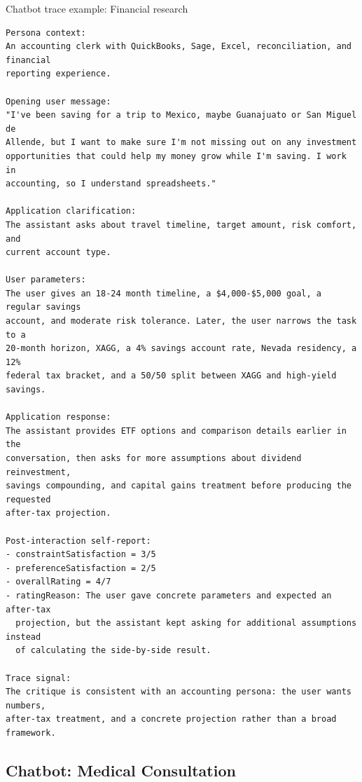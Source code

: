 \begin{promptbox}[label={box:trace-finance}]{Chatbot trace example: Financial research}
\begin{lstlisting}
Persona context:
An accounting clerk with QuickBooks, Sage, Excel, reconciliation, and financial
reporting experience.

Opening user message:
"I've been saving for a trip to Mexico, maybe Guanajuato or San Miguel de
Allende, but I want to make sure I'm not missing out on any investment
opportunities that could help my money grow while I'm saving. I work in
accounting, so I understand spreadsheets."

Application clarification:
The assistant asks about travel timeline, target amount, risk comfort, and
current account type.

User parameters:
The user gives an 18-24 month timeline, a $4,000-$5,000 goal, a regular savings
account, and moderate risk tolerance. Later, the user narrows the task to a
20-month horizon, XAGG, a 4% savings account rate, Nevada residency, a 12%
federal tax bracket, and a 50/50 split between XAGG and high-yield savings.

Application response:
The assistant provides ETF options and comparison details earlier in the
conversation, then asks for more assumptions about dividend reinvestment,
savings compounding, and capital gains treatment before producing the requested
after-tax projection.

Post-interaction self-report:
- constraintSatisfaction = 3/5
- preferenceSatisfaction = 2/5
- overallRating = 4/7
- ratingReason: The user gave concrete parameters and expected an after-tax
  projection, but the assistant kept asking for additional assumptions instead
  of calculating the side-by-side result.

Trace signal:
The critique is consistent with an accounting persona: the user wants numbers,
after-tax treatment, and a concrete projection rather than a broad framework.
\end{lstlisting}
\end{promptbox}

\subsection{Chatbot: Medical Consultation}
\label{app:medical-results}

